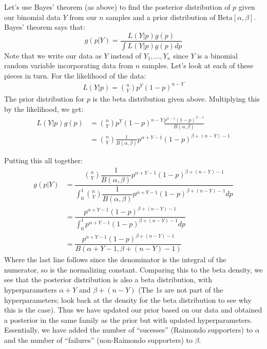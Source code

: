 \documentclass[12pt]{article}
\theoremstyle{definition}
\theoremstyle{remark}
\begin{document}
\begin{enumerate}
Let's use Bayes' theorem (as above) to find the posterior distribution of $p$ given our binomial data $Y$ from our $n$ samples and a prior distribution of Beta$[\alpha, \beta]$.
Bayes' theorem says that:
\[
g(p | Y) = \frac{ L(Y | p ) g(p) }{ \int L(Y|p) g(p) dp }
\] 
Note that we write our data as $Y$ instead of $Y_1, \dots, Y_n$ since $Y$ is a binomial random variable incorporating data from $n$ samples. Let's look at each of these pieces in turn. For the likelihood of the data:
\begin{align*}
L(Y | p ) = \binom{n}{Y}p^{Y}(1-p)^{n-Y}
\end{align*}
The prior distribution for $p$ is the beta distribution given above. Multiplying this by the likelihood, we get:
\begin{align*}
L(Y|p) g(p) &= \binom{n}{Y}p^{Y}(1-p)^{n-Y} \frac{ p^{\alpha - 1} (1-p)^{\beta - 1} }{ B(\alpha, \beta) }\\
&= \binom{n}{Y} \frac{1}{ B(\alpha, \beta) } p^{\alpha + Y - 1} (1-p)^{\beta + (n-Y) - 1}
\end{align*}

Putting this all together:
\begin{align*}
g(p | Y) &= \dfrac{ \binom{n}{Y} \dfrac{1}{ B(\alpha, \beta) } p^{\alpha + Y - 1} (1-p)^{\beta + (n-Y) - 1} }{ \int_0^1 \binom{n}{Y} \dfrac{1}{ B(\alpha, \beta) } p^{\alpha + Y - 1} (1-p)^{\beta + (n-Y) - 1} dp }\\
&= \dfrac{ p^{\alpha + Y - 1} (1-p)^{\beta + (n-Y) - 1} }{ \int_0^1 p^{\alpha + Y - 1} (1-p)^{\beta + (n-Y) - 1} dp }\\
&= \dfrac{ p^{\alpha + Y - 1} (1-p)^{\beta + (n-Y) - 1} }{ B(\alpha + Y - 1, \beta + (n-Y) - 1) }
\end{align*}
Where the last line follows since the denominator is the integral of the numerator, so is the normalizing constant. Comparing this to the beta density, we see that the posterior distribution is also a beta distribution, with hyperparameters $\alpha + Y$ and $\beta + (n - Y)$ (The 1s are not part of the hyperparameters; look back at the density for the beta distribution to see why this is the case). Thus we have updated our prior based on our data and obtained a posterior in the same family as the prior but with updated hyperparameters. Essentially, we have added the number of ``sucesses'' (Raimondo supporters) to $\alpha$ and the number of ``failures'' (non-Raimondo supporters) to $\beta$.\\


\end{enumerate}
\end{document}
